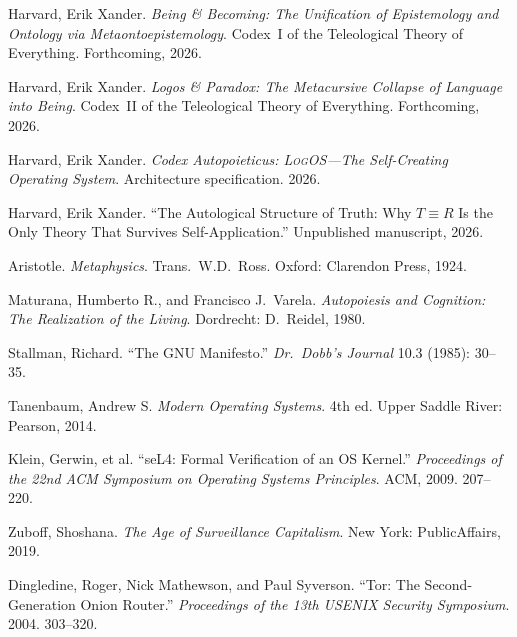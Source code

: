 \documentclass[11pt, oneside]{article}
\newcommand{\LogOS}{\textnormal{\textsc{LogOS}}}
\begin{document}
\begin{description}[leftmargin=1.4em, labelindent=0pt, itemsep=4pt,
                    parsep=0pt, font=\normalfont]

\item Harvard, Erik Xander. \textit{Being \& Becoming: The Unification
      of Epistemology and Ontology via Metaontoepistemology}. Codex~I of
      the Teleological Theory of Everything. Forthcoming, 2026.

\item Harvard, Erik Xander. \textit{Logos \& Paradox: The Metacursive
      Collapse of Language into Being}. Codex~II of the Teleological
      Theory of Everything. Forthcoming, 2026.

\item Harvard, Erik Xander. \textit{Codex Autopoieticus: \LogOS{}---The
      Self-Creating Operating System}. Architecture specification. 2026.

\item Harvard, Erik Xander. ``The Autological Structure of Truth: Why
      $T \equiv R$ Is the Only Theory That Survives Self-Application.''
      Unpublished manuscript, 2026.

\item Aristotle. \textit{Metaphysics}. Trans.\ W.D.\ Ross.
      Oxford: Clarendon Press, 1924.

\item Maturana, Humberto R., and Francisco J.\ Varela.
      \textit{Autopoiesis and Cognition: The Realization of the Living}.
      Dordrecht: D.\ Reidel, 1980.

\item Stallman, Richard. ``The GNU Manifesto.'' \textit{Dr.\ Dobb's
      Journal} 10.3 (1985): 30--35.

\item Tanenbaum, Andrew S. \textit{Modern Operating Systems}. 4th ed.
      Upper Saddle River: Pearson, 2014.

\item Klein, Gerwin, et al. ``seL4: Formal Verification of an OS
      Kernel.'' \textit{Proceedings of the 22nd ACM Symposium on
      Operating Systems Principles}. ACM, 2009. 207--220.

\item Zuboff, Shoshana. \textit{The Age of Surveillance Capitalism}.
      New York: PublicAffairs, 2019.

\item Dingledine, Roger, Nick Mathewson, and Paul Syverson. ``Tor: The
      Second-Generation Onion Router.'' \textit{Proceedings of the 13th
      USENIX Security Symposium}. 2004. 303--320.


\end{description}
\end{document}
